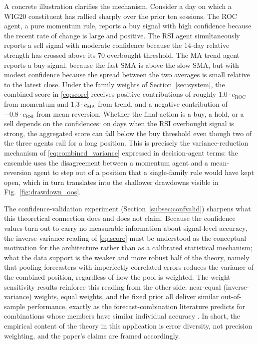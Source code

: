 \documentclass{ieeeaccess}
\begin{document}
A concrete illustration clarifies the mechanism. Consider a day on which a WIG20 constituent has rallied sharply over the prior ten sessions. The ROC agent, a pure momentum rule, reports a buy signal with high confidence because the recent rate of change is large and positive. The RSI agent simultaneously reports a sell signal with moderate confidence because the $14$-day relative strength has crossed above its $70$ overbought threshold. The MA trend agent reports a buy signal, because the fast SMA is above the slow SMA, but with modest confidence because the spread between the two averages is small relative to the latest close. Under the family weights of Section~\ref{sec:system}, the combined score in \eqref{eq:score} receives positive contributions of roughly $1.0 \cdot c_\text{ROC}$ from momentum and $1.3 \cdot c_\text{MA}$ from trend, and a negative contribution of $-0.8 \cdot c_\text{RSI}$ from mean reversion. Whether the final action is a buy, a hold, or a sell depends on the confidences: on days when the RSI overbought signal is strong, the aggregated score can fall below the buy threshold even though two of the three agents call for a long position. This is precisely the variance-reduction mechanism of \eqref{eq:combined_variance} expressed in decision-agent terms: the ensemble uses the disagreement between a momentum agent and a mean-reversion agent to step out of a position that a single-family rule would have kept open, which in turn translates into the shallower drawdowns visible in Fig.~\ref{fig:drawdown_oos}.

The confidence-validation experiment (Section~\ref{subsec:confvalid}) sharpens what this theoretical connection does and does not claim. Because the confidence values turn out to carry no measurable information about signal-level accuracy, the inverse-variance reading of \eqref{eq:score} must be understood as the conceptual motivation for the architecture rather than as a calibrated statistical mechanism; what the data support is the weaker and more robust half of the theory, namely that pooling forecasters with imperfectly correlated errors reduces the variance of the combined position, regardless of how the pool is weighted. The weight-sensitivity results reinforce this reading from the other side: near-equal (inverse-variance) weights, equal weights, and the fixed prior all deliver similar out-of-sample performance, exactly as the forecast-combination literature predicts for combinations whose members have similar individual accuracy \cite{clemen1989,smithwallis2009}. In short, the empirical content of the theory in this application is error diversity, not precision weighting, and the paper's claims are framed accordingly.
\end{document}
